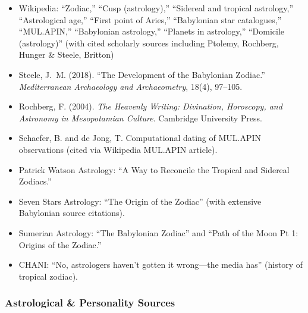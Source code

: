 \documentclass[11pt,letterpaper]{article}
\begin{document}
\begin{itemize}[leftmargin=2em]
\item Wikipedia: ``Zodiac,'' ``Cusp (astrology),'' ``Sidereal and tropical astrology,'' ``Astrological age,'' ``First point of Aries,'' ``Babylonian star catalogues,'' ``MUL.APIN,'' ``Babylonian astrology,'' ``Planets in astrology,'' ``Domicile (astrology)'' (with cited scholarly sources including Ptolemy, Rochberg, Hunger \& Steele, Britton)
\item Steele, J.\ M. (2018). ``The Development of the Babylonian Zodiac.'' \textit{Mediterranean Archaeology and Archaeometry}, 18(4), 97--105.
\item Rochberg, F. (2004). \textit{The Heavenly Writing: Divination, Horoscopy, and Astronomy in Mesopotamian Culture}. Cambridge University Press.
\item Schaefer, B. and de Jong, T. Computational dating of MUL.APIN observations (cited via Wikipedia MUL.APIN article).
\item Patrick Watson Astrology: ``A Way to Reconcile the Tropical and Sidereal Zodiacs.''
\item Seven Stars Astrology: ``The Origin of the Zodiac'' (with extensive Babylonian source citations).
\item Sumerian Astrology: ``The Babylonian Zodiac'' and ``Path of the Moon Pt 1: Origins of the Zodiac.''
\item CHANI: ``No, astrologers haven't gotten it wrong---the media has'' (history of tropical zodiac).
\end{itemize}

\subsubsection{Astrological \& Personality Sources}
\end{document}
